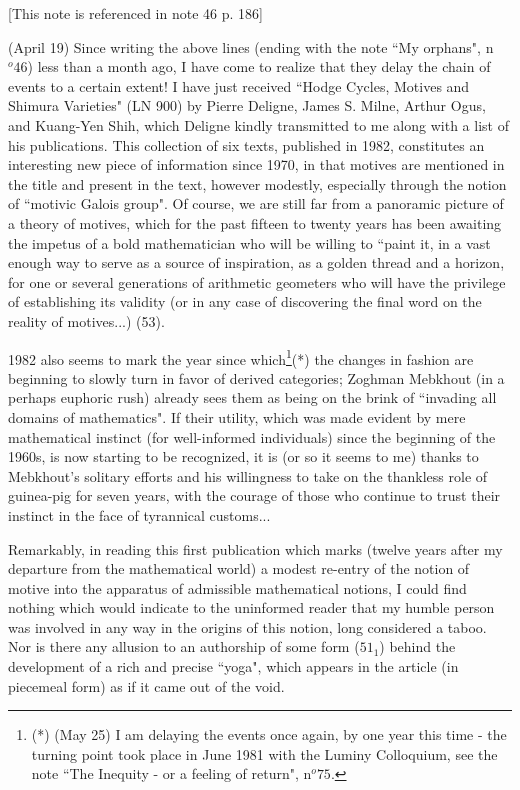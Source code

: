 \label{note:51} [This note is referenced in note 46 p. 186]

(April 19) Since writing the above lines (ending with the note ``My orphans", n$^o 46$) less than a month ago, I have come to realize that they delay the chain of events to a certain extent! I have just received ``Hodge Cycles, Motives and Shimura Varieties" (LN 900) by Pierre Deligne, James S. Milne, Arthur Ogus, and Kuang-Yen Shih, which Deligne kindly transmitted to me along with a list of his publications. This collection of six texts, published in 1982, constitutes an interesting new piece of information since 1970, in that motives are mentioned in the title and present in the text, however modestly, especially through the notion of ``motivic Galois group". Of course, we are still far from a panoramic picture of a theory of motives, which for the past fifteen to twenty years has been awaiting the impetus of a bold mathematician who will be willing to ``paint it, in a vast enough way to serve as a source of inspiration, as a golden thread and a horizon, for one or several generations of arithmetic geometers who will have the privilege of establishing its validity (or in any case of discovering the final word on the reality of motives...) (53).

1982 also seems to mark the year since which\footnote{(*) (May 25) I am delaying the events once again, by one year this time - the turning point took place in June 1981 with the Luminy Colloquium, see the note ``The Inequity - or a feeling of return", n$^o 75$.}(*) the changes in fashion are beginning to slowly turn in favor of derived categories; Zoghman Mebkhout (in a perhaps euphoric rush) already sees them as being on the brink of ``invading all domains of mathematics". If their utility, which was made evident by mere mathematical instinct (for well-informed individuals) since the beginning of the 1960s, is now starting to be recognized, it is (or so it seems to me) thanks to Mebkhout's solitary efforts and his willingness to take on the thankless role of guinea-pig for seven years, with the courage of those who continue to trust their instinct in the face of tyrannical customs...

Remarkably, in reading this first publication which marks (twelve years after my departure from the mathematical world) a modest re-entry of the notion of motive into the apparatus of admissible mathematical notions, I could find nothing which would indicate to the uninformed reader that my humble person was involved in any way in the origins of this notion, long considered a taboo. Nor is there any allusion to an authorship of some form ($51_1$) behind the development of a rich and precise ``yoga", which appears in the article (in piecemeal form) as if it came out of the void.


